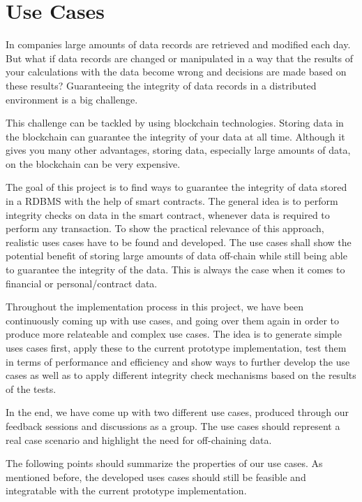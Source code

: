 \chapter{Use Cases} \label{sssec:use_cases}

In companies large amounts of data records are retrieved and modified each day. But what if data records are changed or manipulated in a way that the results of your calculations with the data become wrong and decisions are made based on these results? Guaranteeing the integrity of data records in a distributed environment is a big challenge.

This challenge can be tackled by using blockchain technologies. Storing data in the blockchain can guarantee the integrity of your data at all time. Although it gives you many other advantages, storing data, especially large amounts of data, on the blockchain can be very expensive.

The goal of this project is to find ways to guarantee the integrity of data stored in a RDBMS with the help of smart contracts. The general idea is to perform integrity checks on data in the smart contract, whenever data is required to perform any transaction. To show the practical relevance of this approach, realistic uses cases have to be found and developed. The use cases shall show the potential benefit of storing large amounts of data off-chain while still being able to guarantee the integrity of the data. This is always the case when it comes to financial or personal/contract data.

Throughout the implementation process in this project, we have been continuously coming up with use cases, and going over them again in order to produce more relateable and complex use cases. The idea is to generate simple uses cases first, apply these to the current prototype implementation, test them in terms of performance and efficiency and show ways to further develop the use cases as well as to apply different integrity check mechanisms based on the results of the tests.

In the end, we have come up with two different use cases, produced through our feedback sessions and discussions as a group. The use cases should represent a real case scenario and highlight the need for off-chaining data.

The following points should summarize the properties of our use cases. As mentioned before, the developed uses cases should still be feasible and integratable with the current prototype implementation.

